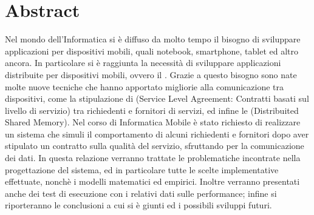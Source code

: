 \chapter*{Abstract}
Nel mondo dell'Informatica si è diffuso da molto tempo il bisogno di sviluppare applicazioni per dispositivi mobili, quali notebook, smartphone, tablet ed altro ancora. In particolare si è raggiunta la necessità di sviluppare applicazioni distribuite per dispositivi mobili, ovvero il . Grazie a questo bisogno sono nate molte nuove tecniche che hanno apportato migliorie alla comunicazione tra dispositivi, come la stipulazione di  (Service Level Agreement: Contratti basati sul livello di servizio) tra richiedenti e fornitori di servizi, ed infine le  (Distribuited Shared Memory). Nel corso di Informatica Mobile è stato richiesto di realizzare un sistema che simuli il comportamento di alcuni richiedenti e fornitori dopo aver stipulato un contratto sulla qualità del servizio, sfruttando  per la comunicazione dei dati. In questa relazione verranno trattate le problematiche incontrate nella progettazione del sistema, ed in particolare tutte le scelte implementative effettuate, nonchè i modelli matematici ed empirici. Inoltre verranno presentati anche dei test di esecuzione con i relativi dati sulle performance; infine si riporteranno le conclusioni a cui si è giunti ed i possibili sviluppi futuri.
